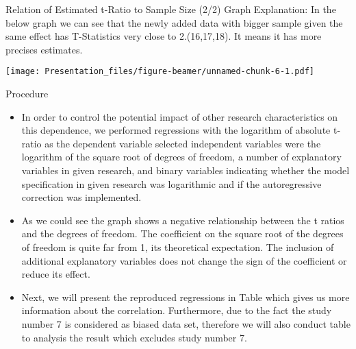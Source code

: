 \documentclass[
  9 pt,
  ignorenonframetext,
]{beamer}
\begin{document}
\begin{frame}{Relation of Estimated t-Ratio to Sample Size (2/2)}
\protect\hypertarget{relation-of-estimated-t-ratio-to-sample-size-22}{}
Graph Explanation: In the below graph we can see that the newly added
data with bigger sample given the same effect has T-Statistics very
close to 2.(16,17,18). It means it has more precises estimates.

\texttt{[image: Presentation\_files/figure-beamer/unnamed-chunk-6-1.pdf]}
\end{frame}

\begin{frame}{Procedure}
\protect\hypertarget{procedure-1}{}
\begin{itemize}
\item
  In order to control the potential impact of other research
  characteristics on this dependence, we performed regressions with the
  logarithm of absolute t-ratio as the dependent variable selected
  independent variables were the logarithm of the square root of degrees
  of freedom, a number of explanatory variables in given research, and
  binary variables indicating whether the model specification in given
  research was logarithmic and if the autoregressive correction was
  implemented.
\item
  As we could see the graph shows a negative relationship between the t
  ratios and the degrees of freedom. The coefficient on the square root
  of the degrees of freedom is quite far from 1, its theoretical
  expectation. The inclusion of additional explanatory variables does
  not change the sign of the coefficient or reduce its effect.
\item
  Next, we will present the reproduced regressions in Table which gives
  us more information about the correlation. Furthermore, due to the
  fact the study number 7 is considered as biased data set, therefore we
  will also conduct table to analysis the result which excludes study
  number 7.
\end{itemize}
\end{frame}
\end{document}
